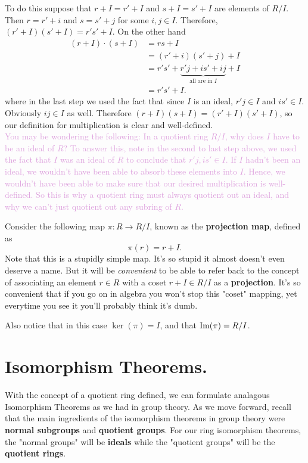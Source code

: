     To do this suppose that $r + I = r' + I$ and $s + I = s' + I$
    are elements of $R/I$. Then $r = r' + i$ and $s = s' + j$ for
    some $i, j \in I$. 
    Therefore, $(r' + I)(s' + I) = r's' + I$. On the other hand
    \begin{align*}
        (r + I)\cdot(s + I) &= rs + I\\
        &= (r' + i)(s' + j) + I\\
        &= r's' + \underbrace{r'j + is' + ij}_{\text{all are in } I} + I\\
        &= r's' + I.
    \end{align*}
    where in the last step we used the fact that since $I$ is an
    ideal, $r'j \in I$ and $is' \in
    I.$ Obviously $ij \in I$ as well. Therefore $(r + I)(s + I) =
    (r' + I)(s' + I)$, so our definition for
    multiplication is clear and well-defined.             
    \\
    
    \textcolor{Plum}{
    You may be wondering the following: In a quotient ring $R/I$,
    why does $I$ have to be an ideal of $R$? To answer this,     
    note in the second to last step above, we
    used the fact that $I$ was 
    an ideal of $R$ to conclude that $r'j, is' \in I$. If $I$
    hadn't been an ideal, we wouldn't have been able to absorb
    these elements into $I$. Hence, we wouldn't have been able to
    make sure that our desired multiplication is well-defined.
    So this is why a quotient ring
    must always quotient out an ideal, and why we can't just
    quotient out any subring of $R$. }
    \begin{definition}
        Consider the following map $\pi: R \to R/I$, known as the
        \textbf{projection map}, defined as 
        \[
            \pi(r) = r + I.
        \]
        Note that this is a stupidly simple map. It's so stupid it
        almost doesn't even deserve a name. But it will be
        \textit{convenient} to be able to refer back to the
        concept of associating an element $r \in R$ with a coset
        $r + I \in R/I$ as a \textbf{projection}. It's so
        convenient that if you go on in algebra you won't stop
        this "coset" mapping, yet everytime you see it you'll
        probably think it's dumb.

        Also notice that in this case $\ker(\pi) = I$, and that
        $\mbox{Im}(\pi) = R/I$.
    \end{definition}        

    \newpage
    \section{Isomorphism Theorems.}
    With the concept of a quotient ring defined, we can formulate
    analagous Isomorphism Theorems as we had in group theory. As
    we move forward, recall that the main ingredients of the
    isomorphism theorems in group theory were \textbf{normal
    subgroups} and \textbf{quotient groups}. For our ring
    isomorphism theorems, the "normal groups" will be
    \textbf{ideals} while the "quotient groups" will be the
    \textbf{quotient rings}. 

